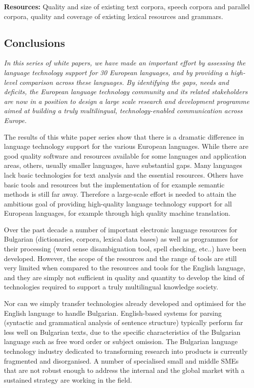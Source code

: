 \documentclass[]{../../metanetpaper}
\begin{document}
\begin{multicols}{2}
\textbf{Resources:} Quality and size of existing text corpora, speech corpora and parallel corpora, quality and coverage of existing lexical resources and grammars.

\subsection{Conclusions}

\emph{In this series of white papers, we have made an important effort by assessing the language technology support for 30 European languages, and by providing a high-level comparison across these languages. By identifying the gaps, needs and deficits, the European language technology community and its related stakeholders are now in a position to design a large scale research and development programme aimed at building a truly multilingual, technology-enabled communication across Europe.}

The results of this white paper series show that there is a dramatic difference in language technology support for the various European languages. While there are good quality software and resources available for some languages and application areas, others, usually smaller languages, have substantial gaps. Many languages lack basic technologies for text analysis and the essential resources. Others have basic tools and resources but the implementation of for example semantic methods is still far away. Therefore a large-scale effort is needed to attain the ambitious goal of providing high-quality language technology support for all European languages, for example through high quality machine translation. 

Over the past decade a number of important electronic language resources for Bulgarian (dictionaries, corpora, lexical data bases) as well as programmes for their processing (word sense disambiguation tool, spell checking, etc..) have been developed. However, the scope of the resources and the range of tools are still very limited when compared to the resources and tools for the English language, and they are simply not sufficient in quality and quantity to develop the kind of technologies required to support a truly multilingual knowledge society.

Nor can we simply transfer technologies already developed and optimised for the English language to handle Bulgarian. English-based systems for parsing (syntactic and grammatical analysis of sentence structure) typically perform far less well on Bulgarian texts, due to the specific characteristics of the Bulgarian language such as free word order or subject omission.
The Bulgarian language technology industry dedicated to transforming research into products is currently fragmented and disorganised. A number of specialised small and middle SMEs that are not robust enough to address the internal and the global market with a sustained strategy are working in the field.


\end{multicols}
\end{document}
